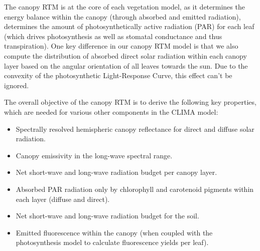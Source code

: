 \documentclass[twoside,10pt]{report}
\begin{document}
The canopy RTM is at the core of each vegetation model, as it determines the energy balance within the canopy (through absorbed and emitted radiation), determines the amount of photosynthetically active radiation (PAR) for each leaf (which drives photosynthesis as well as stomatal conductance and thus transpiration). One key difference in our canopy RTM model is that we also compute the distribution of absorbed direct solar radiation within each canopy layer based on the angular orientation of all leaves towards the sun. Due to the convexity of the photosynthetic Light-Response Curve, this effect can't be ignored. 

The overall objective of the canopy RTM is to derive the following key properties, which are needed for various other components in the CLIMA model:
\begin{itemize}
    \item Spectrally resolved hemispheric canopy reflectance for direct and diffuse solar radiation.
    \item Canopy emissivity in the long-wave spectral range.
    \item Net short-wave and long-wave radiation budget per canopy layer.
    \item Absorbed PAR radiation only by chlorophyll and carotenoid pigments within each layer (diffuse and direct).
    \item Net short-wave and long-wave radiation budget for the soil.
    \item Emitted fluorescence within the canopy (when coupled with the photosynthesis model to calculate fluorescence yields per leaf).
\end{itemize}
 
\end{document}
